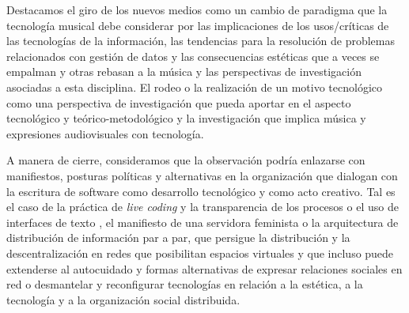Destacamos el giro de los nuevos medios como un cambio de paradigma que la tecnología musical debe considerar por las implicaciones de los usos/críticas de las tecnologías de la información, las tendencias para la resolución de problemas relacionados con gestión de datos y las consecuencias estéticas que a veces se empalman y otras rebasan a la música y las perspectivas de investigación asociadas a esta disciplina. El rodeo o la realización de un motivo tecnológico como una perspectiva de investigación que pueda aportar en el aspecto tecnológico y teórico-metodológico y la investigación que implica música y expresiones audiovisuales con tecnología.


A manera de cierre, consideramos que la observación podría enlazarse con manifiestos, posturas políticas y alternativas en la organización que dialogan con la escritura de software como desarrollo tecnológico y como acto creativo. Tal es el caso de la práctica de \textit{live coding} y la transparencia de los procesos o el uso de interfaces de texto \citep{collinsLivecoding}, el manifiesto de una servidora feminista \citep{feministserver} o la arquitectura de distribución de información par a par, que persigue la distribución y la descentralización en redes que posibilitan espacios virtuales \citep{cyberspace} y que incluso puede extenderse al autocuidado y formas alternativas de expresar relaciones sociales en red \citep{dwc} o desmantelar y reconfigurar tecnologías en relación a la estética, a la tecnología y a la organización social distribuida. 










